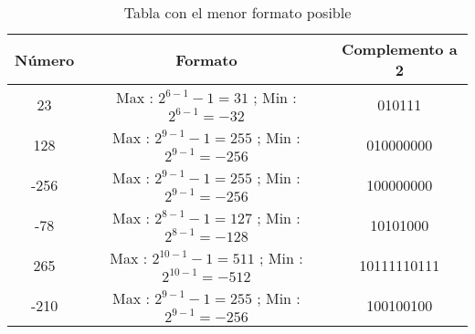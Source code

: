 \documentclass[12pt]{article}
\begin{document}
\begin{table}[h!]
  \centering
  \begin{tabular}{|c|c|c|}
  \hline
  \textbf{Número} & \textbf{Formato} & \textbf{Complemento a 2}\\
  \hline
  23 &  Max : $2^{6-1} -1 = 31$ ; Min : $2^{6-1} = -32$ & 010111 \\\hline
  128 & Max : $2^{9-1} -1 = 255$ ; Min : $2^{9-1} = -256$ & 010000000 \\\hline
  -256 & Max : $2^{9-1} -1 = 255$ ; Min : $2^{9-1} = -256$ & 100000000  \\\hline
  -78 & Max : $2^{8-1} -1 = 127$ ; Min : $2^{8-1} = -128$ & 10101000  \\\hline
  265 & Max : $2^{10-1} -1 = 511$ ; Min : $2^{10-1} = -512$ & 10111110111 \\\hline
  -210 & Max : $2^{9-1} -1 = 255$ ; Min : $2^{9-1} = -256$ & 100100100 \\\hline
  \end{tabular}
  \caption{Tabla con el menor formato posible}
\end{table}
\end{document}
